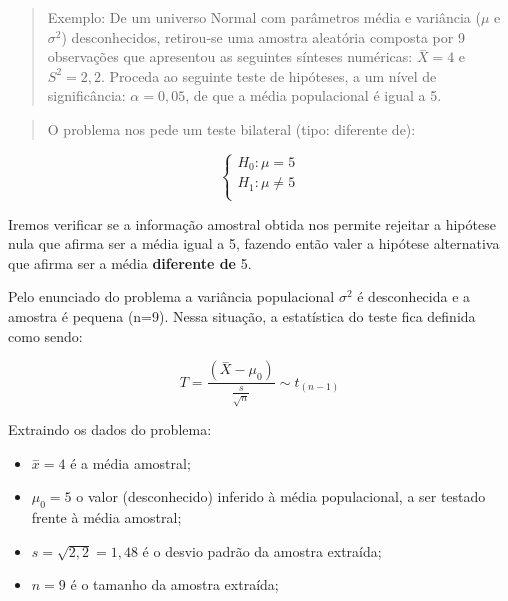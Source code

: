 \documentclass[
]{book}
\providecommand{\tightlist}{%
  \setlength{\itemsep}{0pt}\setlength{\parskip}{0pt}}
\begin{document}
\hfill\break

\begin{quote}
Exemplo: De um universo Normal com parâmetros média e variância (\(\mu\) e \(\sigma^{2}\)) desconhecidos, retirou-se uma amostra aleatória composta por 9 observações que apresentou as seguintes sínteses numéricas: \(\stackrel{-}{X} = 4\) e \(S^{2} = 2,2\). Proceda ao seguinte teste de hipóteses, a um nível de significância: \(\alpha=0,05\), de que a média populacional é igual a 5.
\end{quote}

\hfill\break

\begin{quote}
O problema nos pede um teste bilateral (tipo: diferente de):
\end{quote}

\hfill\break

\[
\begin{cases}
H_{0}: \mu = 5\\
H_{1}: \mu \ne 5\\
\end{cases}
\]

\hfill\break

Iremos verificar se a informação amostral obtida nos permite rejeitar a hipótese nula que afirma ser a média igual a 5, fazendo então valer a hipótese alternativa que afirma ser a média \textbf{diferente de} 5.

\hfill\break

Pelo enunciado do problema a variância populacional \(\sigma^{2}\) é desconhecida e a amostra é pequena (n=9). Nessa situação, a estatística do teste fica definida como sendo:

\hfill\break

\[
T = \frac{(\stackrel{-}{X} - \mu_{0})}{    \frac{s}{\sqrt{n}} } \sim t_{(n-1)}    
\]

\hfill\break

Extraindo os dados do problema:

\hfill\break

\begin{itemize}
\tightlist
\item
  \(\stackrel{-}{x}=4\) é a média amostral;\\
\item
  \(\mu_{0}=5\) o valor (desconhecido) inferido à média populacional, a ser testado frente à média amostral;\\
\item
  \(s = \sqrt{2,2}=1,48\) é o desvio padrão da amostra extraída;\\
\item
  \(n = 9\) é o tamanho da amostra extraída;
\end{itemize}
\end{document}

